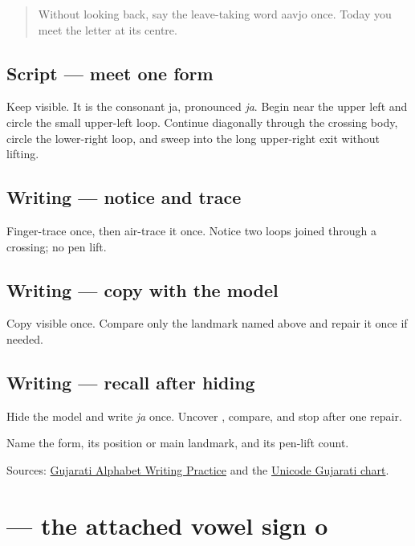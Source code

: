 \label{lesson:GU-W03-ja}



\begin{quote}
Without looking back, say the leave-taking word aavjo once. Today you meet the letter at its centre.
\end{quote}

\subsection*{Script — meet one form}
Keep \textbf{} visible. It is the consonant ja, pronounced \emph{ja}. Begin near the upper left and circle the small upper-left loop. Continue diagonally through the crossing body, circle the lower-right loop, and sweep into the long upper-right exit without lifting.

\subsection*{Writing — notice and trace}

Finger-trace \textbf{} once, then air-trace it once. Notice two loops joined through a crossing; no pen lift.

\subsection*{Writing — copy with the model}
Copy visible \textbf{} once. Compare only the landmark named above and repair it once if needed.

\subsection*{Writing — recall after hiding}
Hide the model and write \emph{ja} once. Uncover \textbf{}, compare, and stop after one repair.

\begin{tcolorbox}[breakable,colback=teal!4,colframe=teal!35!black,title={Before you move on}]
Name the form, its position or main landmark, and its pen-lift count.

Sources: \href{https://www.t30apps.com/gujarati-alphabet-writing/}{Gujarati Alphabet Writing Practice} and the \href{https://www.unicode.org/charts/PDF/U0A80.pdf}{Unicode Gujarati chart}.
\end{tcolorbox}
\section[\texorpdfstring{\gu{ો} (-o)}{ો (-o)}]{ — the attached vowel sign o}

